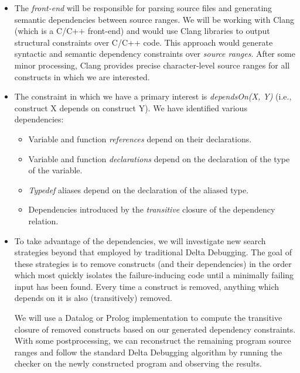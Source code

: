 \documentclass[preprint]{acm_proc_article-sp}
\begin{document}
\begin{itemize}
\item The \emph{front-end} will be responsible for parsing source files and
  generating semantic dependencies between source ranges. We will be working
  with Clang \citep{clang} (which is a C/C++ front-end) and would use Clang libraries to
  output structural constraints over C/C++ code.  This approach would generate
  syntactic and semantic dependency constraints over \emph{source ranges}.  After
  some minor processing, Clang provides precise character-level source ranges for
  all constructs in which we are interested.

\item The constraint in which we have a primary interest is \emph{dependsOn(X,
  Y)} (i.e., construct X depends on construct Y).  We have identified various
  dependencies:

\begin{itemize}
\item{Variable and function \emph{references} depend on their declarations.}
\item{Variable and function \emph{declarations} depend on the declaration of the
  type of the variable.}
\item{\emph{Typedef} aliases depend on the declaration of the aliased type.}
\item{Dependencies introduced by the \emph{transitive} closure of the dependency
  relation.
}
\end{itemize}

\item To take advantage of the dependencies, we will investigate new search
  strategies beyond that employed by traditional Delta Debugging.  The goal of
  these strategies is to remove constructs (and their dependencies) in the order
  which most quickly isolates the failure-inducing code until a minimally
  failing input has been found.  Every time a construct is removed, anything
  which depends on it is also (transitively) removed.

  We will use a Datalog or Prolog implementation to compute the transitive
  closure of removed constructs based on our generated dependency constraints.
  With some postprocessing, we can reconstruct the remaining program source
  ranges and follow the standard Delta Debugging algorithm by running the
  checker on the newly constructed program and observing the results.

\end{itemize}
\end{document}
